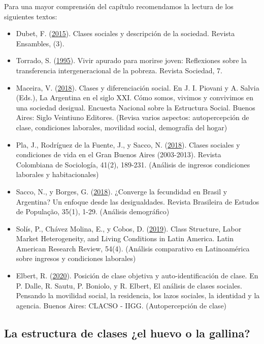 \documentclass[
]{article}
\begin{document}
Para una mayor comprensión del capítulo recomendamos la lectura de los siguientes textos:

\begin{itemize}
\item
  Dubet, F. (\protect\hyperlink{ref-Dubet2015}{2015}). Clases sociales y descripción de la sociedad. Revista Ensambles, (3).
\item
  Torrado, S. (\protect\hyperlink{ref-Torrado1995}{1995}). Vivir apurado para morirse joven: Reflexiones sobre la transferencia intergeneracional de la pobreza. Revista Sociedad, 7.
\item
  Maceira, V. (\protect\hyperlink{ref-Maceira2018}{2018}). Clases y diferenciación social. En J. I. Piovani y A. Salvia (Eds.), La Argentina en el siglo XXI. Cómo somos, vivimos y convivimos en una sociedad desigual. Encuesta Nacional sobre la Estructura Social. Buenos Aires: Siglo Veintiuno Editores. (Revisa varios aspectos: autopercepción de clase, condiciones laborales, movilidad social, demografía del hogar)
\item
  Pla, J., Rodríguez de la Fuente, J., y Sacco, N. (\protect\hyperlink{ref-Pla.etal2018}{2018}). Clases sociales y condiciones de vida en el Gran Buenos Aires (2003-2013). Revista Colombiana de Sociología, 41(2), 189-231. (Análisis de ingresos condiciones laborales y habitacionales)
\item
  Sacco, N., y Borges, G. (\protect\hyperlink{ref-Sacco2018}{2018}). ¿Converge la fecundidad en Brasil y Argentina? Un enfoque desde las desigualdades. Revista Brasileira de Estudos de População, 35(1), 1-29. (Análisis demográfico)
\item
  Solís, P., Chávez Molina, E., y Cobos, D. (\protect\hyperlink{ref-Solis.etal2019}{2019}). Class Structure, Labor Market Heterogeneity, and Living Conditions in Latin America. Latin American Research Review, 54(4). (Análisis comparativo en Latinoamérica sobre ingresos y condiciones laborales)
\item
  Elbert, R. (\protect\hyperlink{ref-Elbert2020}{2020}). Posición de clase objetiva y auto-identificación de clase. En P. Dalle, R. Sautu, P. Boniolo, y R. Elbert, El análisis de clases sociales. Pensando la movilidad social, la residencia, los lazos sociales, la identidad y la agencia. Buenos Aires: CLACSO - IIGG. (Autopercepción de clase)
\end{itemize}

\hypertarget{huevo}{%
\subsection{La estructura de clases ¿el huevo o la gallina?}\label{huevo}}
\end{document}
